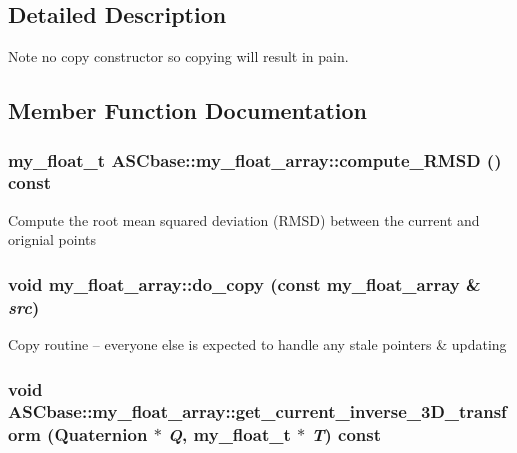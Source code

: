 \subsection{Detailed Description}
Note no copy constructor so copying will result in pain. 



\subsection{Member Function Documentation}
\subsubsection{\setlength{\rightskip}{0pt plus 5cm}my\_\-float\_\-t ASCbase::my\_\-float\_\-array::compute\_\-RMSD () const\hspace{0.3cm}{\tt  [inline]}}\label{classASCbase_1_1my__float__array_ea4337b692bde44840c4affc07cf7095}


Compute the root mean squared deviation (RMSD) between the current and orignial points 
\subsubsection{\setlength{\rightskip}{0pt plus 5cm}void my\_\-float\_\-array::do\_\-copy (const \bf{my\_\-float\_\-array} \& {\em src})\hspace{0.3cm}{\tt  [private]}}\label{classASCbase_1_1my__float__array_06718ce6dbd8d6904e31f34943499e09}


Copy routine -- everyone else is expected to handle any stale pointers \& updating 
\subsubsection{\setlength{\rightskip}{0pt plus 5cm}void ASCbase::my\_\-float\_\-array::get\_\-current\_\-inverse\_\-3D\_\-transform (Quaternion $\ast$ {\em Q}, my\_\-float\_\-t $\ast$ {\em T}) const\hspace{0.3cm}{\tt  [inline]}}\label{classASCbase_1_1my__float__array_f341a7e9e7bde491843bf95e61650eee}


